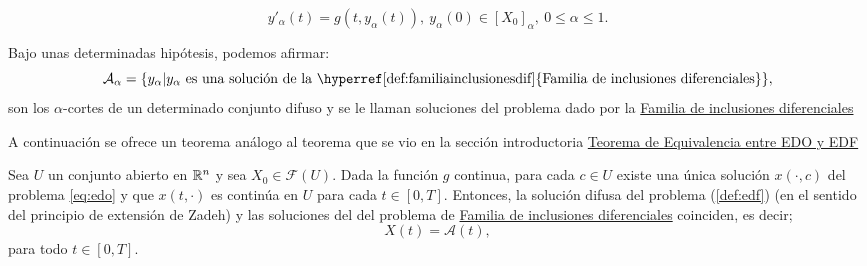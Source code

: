 \begin{equation}
	\label{def:familiainclusionesdif}
	y'_\alpha(t) = g(t, y_\alpha(t)), ~ y_\alpha(0) \in [X_0]_\alpha, ~ 0 \leq \alpha \leq 1.
\end{equation}

Bajo unas determinadas hipótesis, podemos afirmar:
\[
	\mathcal{A}_\alpha = \{y_\alpha | y_\alpha ~ \text{es una solución de la \hyperref[def:familiainclusionesdif]{Familia de inclusiones diferenciales}}\},
\]
son los $\alpha$-cortes de un determinado conjunto difuso y se le llaman soluciones del problema dado por la \hyperref[def:familiainclusionesdif]{Familia de inclusiones diferenciales}

A continuación se ofrece un teorema análogo al teorema que se vio en la sección introductoria \hyperref[teorema:equivalencia]{Teorema de Equivalencia entre EDO y EDF}
\begin{teorema}
	Sea $U$ un conjunto abierto en $\mathbb R^n$ y sea $X_0 \in \mathcal{F}(U)$. Dada la función $g$ continua, para cada $c \in U$ existe una única solución $x(\cdot, c)$ del problema \ref{eq:edo} y que $x(t, \cdot)$ es continúa en $U$ para cada $t \in [0, T]$. Entonces, la solución difusa del problema (\ref{def:edf}) (en el sentido del principio de extensión de Zadeh) y las soluciones del del problema de \hyperref[def:familiainclusionesdif]{Familia de inclusiones diferenciales} coinciden, es decir;
	\[
		X(t) = \mathcal{A}(t),
	\]
	para todo $t \in [0, T]$.
\end{teorema}
